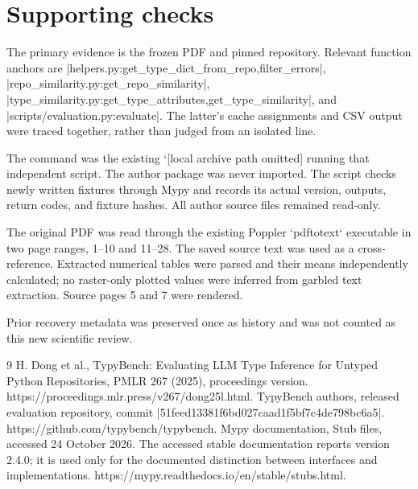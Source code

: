\documentclass[10pt]{article}
\begin{document}
\section*{Supporting checks}
The primary evidence is the frozen PDF and pinned repository. Relevant function anchors are |helpers.py:get\_type\_dict\_from\_repo,filter\_errors|, |repo\_similarity.py:get\_repo\_similarity|, |type\_similarity.py:get\_type\_attributes,get\_type\_similarity|, and |scripts/evaluation.py:evaluate|. The latter’s cache assignments and CSV output were traced together, rather than judged from an isolated line.\par
The command was the existing `[local archive path omitted] running that independent script. The author package was never imported. The script checks newly written fixtures through Mypy and records its actual version, outputs, return codes, and fixture hashes. All author source files remained read-only.\par
The original PDF was read through the existing Poppler `pdftotext` executable in two page ranges, 1–10 and 11–28. The saved source text was used as a cross-reference. Extracted numerical tables were parsed and their means independently calculated; no raster-only plotted values were inferred from garbled text extraction. Source pages 5 and 7 were rendered.\par
Prior recovery metadata was preserved once as history and was not counted as this new scientific review.\par
9 H. Dong et al., TypyBench: Evaluating LLM Type Inference for Untyped Python Repositories, PMLR 267 (2025), proceedings version. https://proceedings.mlr.press/v267/dong25l.html. TypyBench authors, released evaluation repository, commit |51feed13381f6bd027caad1f5bf7c4de798bc6a5|. https://github.com/typybench/typybench. Mypy documentation, Stub files, accessed 24 October 2026. The accessed stable documentation reports version 2.4.0; it is used only for the documented distinction between interfaces and implementations. https://mypy.readthedocs.io/en/stable/stubs.html.\par
\end{document}
